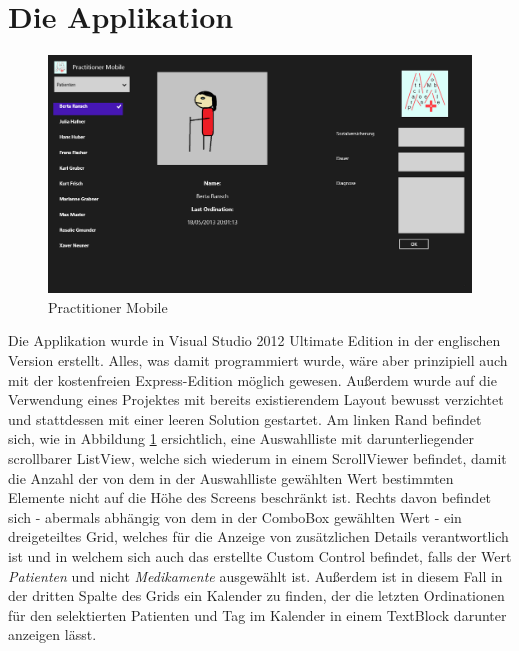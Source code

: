 \documentclass[a4paper,bibtotoc,oneside]{scrbook}
\begin{document}
\section[Die Applikation]{Die Applikation}
\begin{figure}[htbp]
\centering
\includegraphics[scale=0.4]{images/practitionermobile.png}
\caption[Practitioner Mobile]{Practitioner Mobile}\label{img:practitionermobile}
\end{figure}
Die Applikation wurde in Visual Studio 2012 Ultimate Edition in der englischen Version erstellt. Alles, was damit programmiert wurde, wäre aber prinzipiell auch mit der kostenfreien Express-Edition möglich gewesen.
\newline
Außerdem wurde auf die Verwendung eines Projektes mit bereits existierendem Layout bewusst verzichtet und stattdessen mit einer leeren Solution gestartet.
\newline
\newline
Am linken Rand befindet sich, wie in Abbildung \ref{img:practitionermobile} ersichtlich, eine Auswahlliste mit darunterliegender scrollbarer ListView, welche sich wiederum in einem ScrollViewer befindet, damit die Anzahl der von dem in der Auswahlliste gewählten Wert bestimmten Elemente nicht auf die Höhe des Screens beschränkt ist.
\newline
\newline
Rechts davon befindet sich - abermals abhängig von dem in der ComboBox gewählten Wert - ein dreigeteiltes Grid, welches für die Anzeige von zusätzlichen Details verantwortlich ist und in welchem sich auch das erstellte Custom Control befindet, falls der Wert \textit{Patienten} und nicht \textit{Medikamente} ausgewählt ist. Außerdem ist in diesem Fall in der dritten Spalte des Grids ein Kalender zu finden, der die letzten Ordinationen für den selektierten Patienten und Tag im Kalender in einem TextBlock darunter anzeigen lässt.
\end{document}
